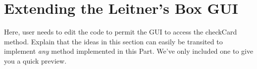 \newpage
\section{Extending the Leitner's Box GUI}
\genHeader

Here, user needs to edit the code to permit the GUI to access the checkCard method. Explain that the ideas in this section can easily be transited to implement
\emph{any} method implemented in this Part. We've only included one to give you a quick preview.

